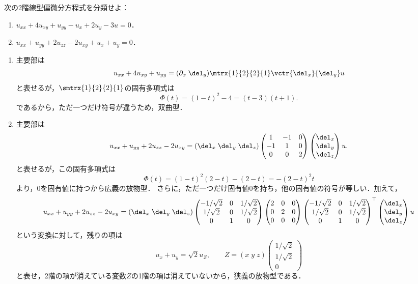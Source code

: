 \documentclass[uplatex,dvipdfmx]{jsreport}
\begin{document}
\begin{problem}
    次の2階線型偏微分方程式を分類せよ：
    \begin{enumerate}
        \item $u_{xx}+4u_{xy}+u_{yy}-u_x+2u_y-3u=0$．
        \item $u_{xx}+u_{yy}+2u_{zz}-2u_{xy}+u_x+u_y=0$．
    \end{enumerate}
\end{problem}
\begin{Proof}[\underline{\bf【解】}]\mbox{}
    \begin{enumerate}
        \item 主要部は
        \[u_{xx}+4u_{xy}+u_{yy}=(\partial_x\;\del_y)\mtrx{1}{2}{2}{1}\vctr{\del_x}{\del_y}u\]
        と表せるが，$\smtrx{1}{2}{2}{1}$の固有多項式は
        \[\Phi(t)=(1-t)^2-4=(t-3)(t+1).\]
        であるから，ただ一つだけ符号が違うため，双曲型．
        \item 主要部は
        \[u_{xx}+u_{yy}+2u_{zz}-2u_{xy}=(\del_x\;\del_y\;\del_z)\begin{pmatrix}1&-1&0\\-1&1&0\\0&0&2\end{pmatrix}\begin{pmatrix}\del_x\\\del_y\\\del_z\end{pmatrix}u.\]
        と表せるが，この固有多項式は
        \[\Phi(t)=(1-t)^2(2-t)-(2-t)=-(2-t)^2t\]
        より，$0$を固有値に持つから広義の放物型．
        さらに，ただ一つだけ固有値$0$を持ち，他の固有値の符号が等しい．加えて，
        \[u_{xx}+u_{yy}+2u_{zz}-2u_{xy}=(\del_x\;\del_y\;\del_z)\begin{pmatrix}-1/\sqrt{2}&0&1/\sqrt{2}\\1/\sqrt{2}&0&1/\sqrt{2}\\0&1&0\end{pmatrix}\begin{pmatrix}2&0&0\\0&2&0\\0&0&0\end{pmatrix}\begin{pmatrix}-1/\sqrt{2}&0&1/\sqrt{2}\\1/\sqrt{2}&0&1/\sqrt{2}\\0&1&0\end{pmatrix}^\top\begin{pmatrix}\del_x\\\del_y\\\del_z\end{pmatrix}u\]
        という変換に対して，残りの項は
        \[u_x+u_y=\sqrt{2}u_Z,\qquad Z=(x\;y\;z)\begin{pmatrix}1/\sqrt{2}\\1/\sqrt{2}\\0\end{pmatrix}\]
        と表せ，2階の項が消えている変数$Z$の1階の項は消えていないから，狭義の放物型である．
    \end{enumerate}
\end{Proof}
\end{document}
